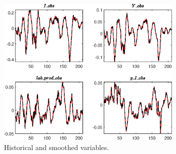  
\begin{figure}[H]
\centering 
\includegraphics[width=0.80\textwidth]{BRS/graphs/BRS_HistoricalAndSmoothedVariables1}
\caption{Historical and smoothed variables.}\label{Fig:HistoricalAndSmoothedVariables:1}
\end{figure}


